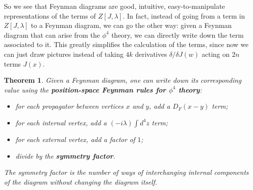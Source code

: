 \documentclass{report}
\theoremstyle{plain}
\newtheorem{theorem}{Theorem}[section]
\theoremstyle{definition}
\theoremstyle{remark}
\begin{document}
So we see that Feynman diagrams are good, intuitive,
easy-to-manipulate representations of the terms of $Z[J, \lambda]$. In
fact, instead of going from a term in $Z[J, \lambda]$ to a Feynman
diagram, we can go the other way: given a Feynman diagram that can
arise from the $\phi^4$ theory, we can directly write down the term
associated to it. This greatly simplifies the calculation of the
terms, since now we can just draw pictures instead of taking $4k$
derivatives $\delta/\delta J(w)$ acting on $2n$ terms $J(x)$.

\begin{theorem}
  Given a Feynman diagram, one can write down its corresponding value
  using the {\bf position-space Feynman rules for $\phi^4$ theory}:
  \begin{itemize}
  \item for each propagator between vertices $x$ and $y$, add a $D_F(x - y)$ term;
  \item for each internal vertex, add a $(-i\lambda) \int d^4z$ term;
  \item for each external vertex, add a factor of $1$;
  \item divide by the {\bf symmetry factor}.
  \end{itemize}
  The symmetry factor is the number of ways of interchanging internal
  components of the diagram without changing the diagram itself.
\end{theorem}
\end{document}
